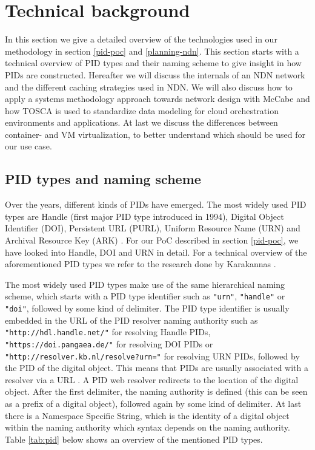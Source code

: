 \section{Technical background}
\label{tech-oview}

In this section we give a detailed overview of the technologies used in our methodology in section \ref{pid-poc} and \ref{planning-ndn}. This section starts with a technical overview of PID types and their naming scheme to give insight in how PIDs are constructed. Hereafter we will discuss the internals of an NDN network and the different caching strategies used in NDN. We will also discuss how to apply a systems methodology approach towards network design with McCabe and how TOSCA is used to standardize data modeling for cloud orchestration environments and applications. At last we discuss the differences between container- and VM virtualization, to better understand which should be used for our use case.

\subsection{PID types and naming scheme}\label{pid-types}
Over the years, different kinds of PIDs have emerged. The most widely used PID types are Handle (first major PID type introduced 
in 1994), Digital Object Identifier (DOI), Persistent URL (PURL), Uniform Resource Name (URN) and 
Archival Resource Key (ARK) \cite{pid-oview, odin, hdl}. For our PoC described in section \ref{pid-poc}, we have looked into Handle, DOI and URN in detail. For a technical overview of the aforementioned PID types we refer to the research done by Karakannas \cite{icn-bd}. 

The most widely used PID types make use of the same hierarchical naming scheme, which starts with a PID type identifier
 such as \texttt{"urn"}, \texttt{"handle"} or \texttt{"doi"}, followed by some kind of delimiter. The PID type identifier is usually embedded in the URL of the PID resolver naming authority 
such as \texttt{"http://hdl.handle.net/"} for resolving Handle PIDs, \texttt{"https://doi.pangaea.de/"} for resolving DOI PIDs or \texttt{"http://resolver.kb.nl/resolve?urn="} for resolving URN PIDs, followed by the PID of the digital object. This means that PIDs are usually associated with a resolver via a URL \cite{ids, icn-bd}. A PID web resolver redirects to the location of the digital object.
After the first delimiter, the naming authority is defined (this can be seen as a prefix of a digital object), followed again 
by some kind of delimiter. At last there is a Namespace Specific String, which is the identity of a digital object within the naming authority which syntax depends on the naming
authority. Table \ref{tab:pid} below shows an overview of the mentioned PID types. 

